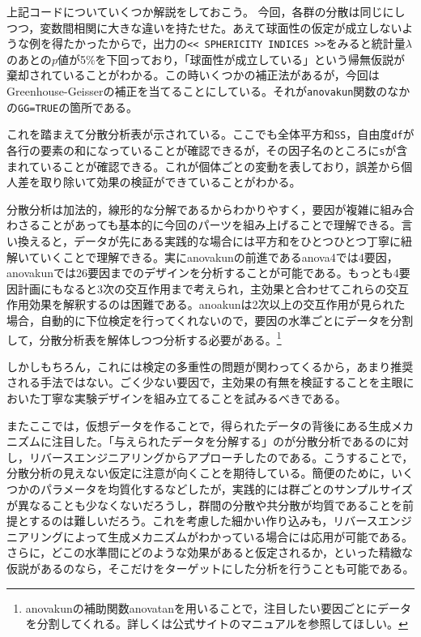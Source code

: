 \documentclass[
  a4paper,
]{ltjsbook}
\begin{document}
上記コードについていくつか解説をしておこう。
今回，各群の分散は同じにしつつ，変数間相関に大きな違いを持たせた。あえて球面性の仮定が成立しないような例を得たかったからで，出力の\texttt{\textless{}\textless{}\ SPHERICITY\ INDICES\ \textgreater{}\textgreater{}}をみると統計量\(\lambda\)のあとの\(p\)値が5\%を下回っており，「球面性が成立している」という帰無仮説が棄却されていることがわかる。この時いくつかの補正法があるが，今回はGreenhouse-Geisserの補正を当てることにしている。それが\texttt{anovakun}関数のなかの\texttt{GG=TRUE}の箇所である。

これを踏まえて分散分析表が示されている。ここでも全体平方和\texttt{SS}，自由度\texttt{df}が各行の要素の和になっていることが確認できるが，その因子名のところに\texttt{s}が含まれていることが確認できる。これが個体ごとの変動を表しており，誤差から個人差を取り除いて効果の検証ができていることがわかる。

分散分析は加法的，線形的な分解であるからわかりやすく，要因が複雑に組み合わさることがあっても基本的に今回のパーツを組み上げることで理解できる。言い換えると，データが先にある実践的な場合には平方和をひとつひとつ丁寧に紐解いていくことで理解できる。実にanovakunの前進であるanova4では4要因，anovakunでは26要因までのデザインを分析することが可能である。もっとも4要因計画にもなると3次の交互作用まで考えられ，主効果と合わせてこれらの交互作用効果を解釈するのは困難である。anoakunは2次以上の交互作用が見られた場合，自動的に下位検定を行ってくれないので，要因の水準ごとにデータを分割して，分散分析表を解体しつつ分析する必要がある。\footnote{anovakunの補助関数anovatanを用いることで，注目したい要因ごとにデータを分割してくれる。詳しくは公式サイトのマニュアルを参照してほしい。}

しかしもちろん，これには検定の多重性の問題が関わってくるから，あまり推奨される手法ではない。ごく少ない要因で，主効果の有無を検証することを主眼においた丁寧な実験デザインを組み立てることを試みるべきである。

またここでは，仮想データを作ることで，得られたデータの背後にある生成メカニズムに注目した。「与えられたデータを分解する」のが分散分析であるのに対し，リバースエンジニアリングからアプローチしたのである。こうすることで，分散分析の見えない仮定に注意が向くことを期待している。簡便のために，いくつかのパラメータを均質化するなどしたが，実践的には群ごとのサンプルサイズが異なることも少なくないだろうし，群間の分散や共分散が均質であることを前提とするのは難しいだろう。これを考慮した細かい作り込みも，リバースエンジニアリングによって生成メカニズムがわかっている場合には応用が可能である。さらに，どこの水準間にどのような効果があると仮定されるか，といった精緻な仮説があるのなら，そこだけをターゲットにした分析を行うことも可能である。
\end{document}
